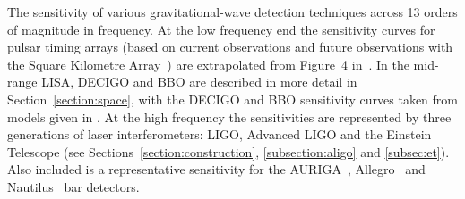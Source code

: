 \label{fig:fullspectrum}
The sensitivity of various gravitational-wave detection
    techniques across 13 orders of magnitude in frequency. At the low
    frequency end the sensitivity curves for pulsar timing arrays
    (based on current observations and future observations with the
    Square Kilometre Array~\cite{SKA}) are extrapolated from Figure~4
    in~\cite{Yardley:2010}. In the mid-range LISA, DECIGO and BBO are
    described in more detail in Section~\ref{section:space}, with the
    DECIGO and BBO sensitivity curves taken from models given in
    \cite{Yagi:2011}. At the high frequency the sensitivities are
    represented by three generations of laser interferometers: LIGO,
    Advanced LIGO and the Einstein Telescope (see
    Sections~\ref{section:construction}, \ref{subsection:aligo} and
    \ref{subsec:et}). Also included is a representative sensitivity
    for the AURIGA~\cite{AURIGA}, Allegro~\cite{Mauceli:1996} and
    Nautilus~\cite{NAUTILUS} bar detectors.
  
  